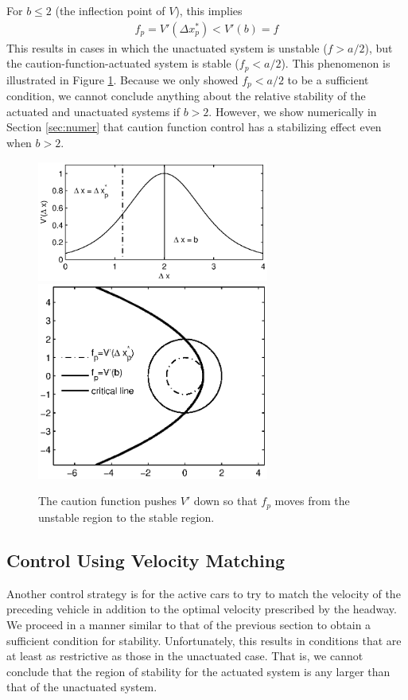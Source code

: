 \documentclass[10pt,twocolumn]{article}
\theoremstyle{ss}
\begin{document}
For $b \leq 2$ (the inflection point of $V$), this implies
\begin{gather}
f_p = V'(\Delta x_p^*) < V'(b) = f
\end{gather}
This results in cases in which the unactuated system is unstable ($f > a/2$), but the caution-function-actuated system is stable ($f_p < a/2$). This phenomenon is illustrated in Figure \ref{fig:ctrstbl}. Because we only showed $f_p < a/2$ to be a sufficient condition, we cannot conclude anything about the relative stability of the actuated and unactuated systems if $b>2$. However, we show numerically in Section \ref{sec:numer} that caution function control has a stabilizing effect even when $b>2$. 

\begin{figure}[!h]
\begin{center}
\includegraphics[width=3in]{vopt_caution}
\includegraphics[width=3in]{ctrstbl}
\end{center}
\caption{ \label{fig:ctrstbl} The caution function pushes $V'$ down so that $f_p$ moves from the unstable region to the stable region.}
\end{figure}

\subsection{Control Using Velocity Matching}
Another control strategy is for the active cars to try to match the velocity of the preceding vehicle in addition to the optimal velocity prescribed by the headway. We proceed in a manner similar to that of the previous section to obtain a sufficient condition for stability. Unfortunately, this results in conditions that are at least as restrictive as those in the unactuated case. That is, we cannot conclude that the region of stability for the actuated system is any larger than that of the unactuated system. 
\end{document}
